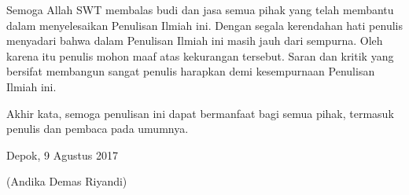 \documentclass[pi.tex]{subfile}
\begin{document}
Semoga Allah SWT membalas budi dan jasa semua pihak yang telah membantu dalam menyelesaikan Penulisan Ilmiah ini. Dengan segala kerendahan hati penulis menyadari bahwa dalam Penulisan Ilmiah ini masih jauh dari sempurna. Oleh karena itu penulis mohon maaf atas kekurangan tersebut. Saran dan kritik yang bersifat membangun sangat penulis harapkan demi kesempurnaan Penulisan Ilmiah ini.

Akhir kata, semoga penulisan ini dapat bermanfaat bagi semua pihak, termasuk penulis dan pembaca pada umumnya.

\begin{flushright}
 Depok, 9 Agustus 2017
 
\vspace{2cm}

(Andika Demas Riyandi)
\end{flushright}
\end{document}
